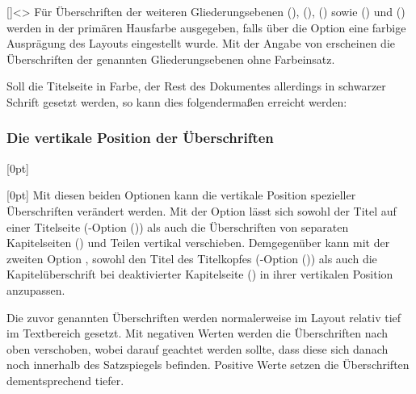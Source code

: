 \begin{Declaration*}{}
\begin{Declaration*}{}
\begin{Declaration*}{}
\begin{Declaration}[v2.05]{}%
  []<\cdalias>
\printdeclarationlist%
%
Für Überschriften der weiteren Gliederungsebenen
(), 
(), 
() sowie 
() und 
()
werden in der primären Hausfarbe  ausgegeben, falls über die 
Option  eine farbige Ausprägung des Layouts eingestellt wurde. 
Mit der Angabe von  erscheinen die Überschriften der 
genannten Gliederungsebenen ohne Farbeinsatz.
\end{Declaration}
%
\begin{Example}
Soll die Titelseite in Farbe, der Rest des Dokumentes allerdings in schwarzer 
Schrift gesetzt werden, so kann dies folgendermaßen erreicht werden:
%
%
\end{Example}


\subsubsection{Die vertikale Position der Überschriften}
\begin{Declaration}[v2.05]{}[0pt]%
\begin{Declaration}[v2.05]{}[0pt]%
\printdeclarationlist%
%
%
%
Mit diesen beiden Optionen kann die vertikale Position spezieller Überschriften 
verändert werden. Mit der Option  lässt sich sowohl 
der Titel auf einer Titelseite 
(\KOMAScript-Option ()) als auch 
die Überschriften von separaten Kapitelseiten () und 
Teilen vertikal verschieben. Demgegenüber kann mit der zweiten Option 
, sowohl den Titel des Titelkopfes 
(\KOMAScript-Option ()) als auch 
die Kapitelüberschrift bei deaktivierter Kapitelseite 
() in ihrer vertikalen Position anzupassen.

Die zuvor genannten Überschriften werden normalerweise im Layout relativ tief 
im Textbereich gesetzt. Mit negativen Werten werden die Überschriften nach oben 
verschoben, wobei darauf geachtet werden sollte, dass diese sich danach noch 
innerhalb des Satzspiegels befinden. Positive Werte setzen die Überschriften 
dementsprechend tiefer.
%
\end{Declaration}
\end{Declaration}




\end{Declaration*}
\end{Declaration*}
\end{Declaration*}
